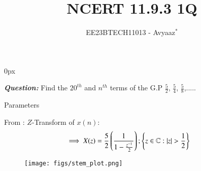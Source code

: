 \documentclass[journal,12pt,twocolumn]{IEEEtran}
\theoremstyle{remark}
\begin{document}
\parindent 0px

\vspace{3cm}

\title{NCERT 11.9.3 1Q}
\author{EE23BTECH11013 - Avyaaz$^{*}$%
}
\maketitle
\newpage
\bigskip

\renewcommand{\thefigure}{\arabic{figure}}
\renewcommand{\thetable}{\arabic{table}}
\large\textbf{\textsl{Question:}}
Find the $20^{th}$ and $n^{th}$ terms of the G.P $\frac{5}{2}$, $\frac{5}{4}$, $\frac{5}{8}$,.....

\solution
 \begin{table}[htbp]
     \centering
     \setlength{\extrarowheight}{8pt}
    
     \caption{Parameters}
     \label{tab:table1}
 \end{table} 


 
From :
\(Z\)-Transform of \(x(n)\):
\begin{align}
\implies X(z) &=\dfrac{5}{2}\left(\dfrac{1}{1-\frac{z^{-1}}{2}}\right) ;\cbrak{z\in\mathbb{C} : |z|>\dfrac{1}{2}}
\end{align}

\begin{figure}[ht]
    \centering
    \texttt{[image: figs/stem\_plot.png]}
    \caption{}
    \label{fig:graph1}
\end{figure} 


\end{document}
